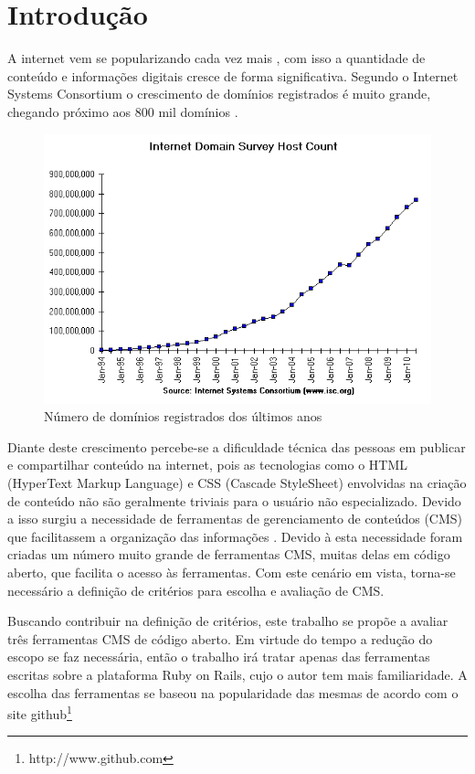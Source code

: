\chapter{Introdução}

A internet vem se popularizando cada vez mais \cite{internet_stats}, com isso a quantidade de conteúdo e informações digitais cresce de forma significativa. Segundo o Internet Systems Consortium o crescimento de domínios registrados é muito grande, chegando próximo aos 800 mil domínios \cite{isc}. 

\begin{figure}[here]
\includegraphics[width=150mm]{images/isc_hosts.png}
\caption{Número de domínios registrados dos últimos anos}
\label{fig:isc_hosts.png}
\end{figure}

Diante deste crescimento percebe-se a dificuldade técnica das pessoas em publicar e compartilhar conteúdo na internet, pois as  tecnologias como o HTML (HyperText Markup Language)  e CSS (Cascade StyleSheet) envolvidas na criação de conteúdo não são geralmente triviais para o usuário não especializado. Devido a isso surgiu a necessidade de ferramentas de gerenciamento de conteúdos (CMS) que facilitassem a organização das informações \cite{content_for_one}. Devido à esta necessidade foram criadas um número muito grande de ferramentas CMS, muitas delas em código aberto, que facilita o acesso às ferramentas. Com este cenário em vista, torna-se necessário a definição de critérios para escolha e avaliação de CMS.

Buscando contribuir na definição de critérios, este trabalho se propõe a avaliar três ferramentas CMS de código aberto. Em virtude do tempo a redução do escopo se faz necessária, então o trabalho irá tratar apenas das ferramentas escritas sobre a plataforma Ruby on Rails, cujo o autor tem mais familiaridade. A escolha das ferramentas se baseou na popularidade das mesmas de acordo com o site github\footnote{http://www.github.com}

